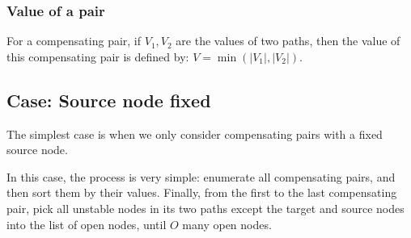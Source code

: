 \documentclass{llncs}
\begin{document}
\subsubsection*{Value of a pair}


For a compensating pair, if $V_1,V_2$ are the values of two paths, then the value of this compensating pair is defined by: $V=\min(|V_1|,|V_2|)$.


\subsection*{Case: Source node fixed}

The simplest case is when we only consider compensating pairs with a fixed source node. 

In this case, the process is very simple: enumerate all compensating pairs, and then sort them by their values. Finally, from the first to the last compensating pair, pick all unstable nodes in its two paths except the target and source nodes into the list of open nodes, until $O$ many open nodes. 
\end{document}
